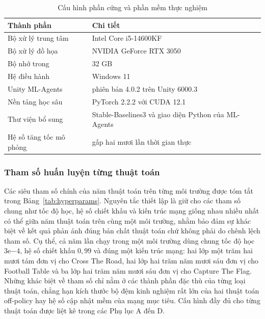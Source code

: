 \begin{table}[H]
\centering
\caption{Cấu hình phần cứng và phần mềm thực nghiệm}
\label{tab:hardware}
\renewcommand{\arraystretch}{1.4}
\tablefont
\begin{tabular}{|p{4.5cm}|p{9cm}|}
\hline
\textbf{Thành phần} & \textbf{Chi tiết} \\
\hline
Bộ xử lý trung tâm & Intel Core i5-14600KF \\
\hline
Bộ xử lý đồ họa & NVIDIA GeForce RTX 3050 \\
\hline
Bộ nhớ trong & 32 GB \\
\hline
Hệ điều hành & Windows 11 \\
\hline
Unity ML-Agents & phiên bản 4.0.2 trên Unity 6000.3 \\
\hline
Nền tảng học sâu & PyTorch 2.2.2 với CUDA 12.1 \\
\hline
Thư viện bổ sung & Stable-Baselines3 và giao diện Python của ML-Agents \\
\hline
Hệ số tăng tốc mô phỏng & gấp hai mươi lần thời gian thực \\
\hline
\end{tabular}
\end{table}

\subsubsection{Tham số huấn luyện từng thuật toán}
\indent Các siêu tham số chính của năm thuật toán trên từng môi trường được tóm tắt
trong Bảng~\ref{tab:hyperparams}. Nguyên tắc thiết lập là giữ cho các tham số chung
như tốc độ học, hệ số chiết khấu và kiến trúc mạng giống nhau nhiều nhất có thể giữa
năm thuật toán trên cùng một môi trường, nhằm bảo đảm sự khác biệt về kết quả phản ánh
đúng bản chất thuật toán chứ không phải do chênh lệch tham số. Cụ thể, cả năm lần chạy
trong một môi trường dùng chung tốc độ học $3\text{e}{-4}$, hệ số chiết khấu $0{,}99$
và đúng một kiến trúc mạng: hai lớp một trăm hai mươi tám đơn vị cho Cross The Road,
hai lớp hai trăm năm mươi sáu đơn vị cho Football Table và ba lớp hai trăm năm mươi sáu
đơn vị cho Capture The Flag. Những khác biệt về tham
số chỉ nằm ở các thành phần đặc thù của từng loại thuật toán, chẳng hạn kích thước bộ
đệm kinh nghiệm rất lớn của hai thuật toán off-policy hay hệ số cập nhật mềm của mạng
mục tiêu. Cấu hình đầy đủ cho từng thuật toán được liệt kê trong các Phụ lục A đến D.


